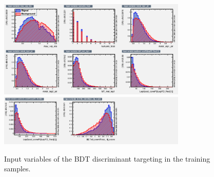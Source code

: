 
\begin{figure}[hbtp]
 \begin{center}
   \includegraphics[width=0.8\textwidth]{ch9_figs/train_2lss_ttv_hj_value/variables_id_c1.png}
   \includegraphics[width=0.8\textwidth]{ch9_figs/train_2lss_ttv_hj_value/variables_id_c2.png}
   \caption[Input variables of the BDT discriminant targeting \ttv]{Input variables of the BDT discriminant targeting \ttv in the training samples.}
   \label{fig:ttvBdt_inputs}
 \end{center}
\end{figure}

